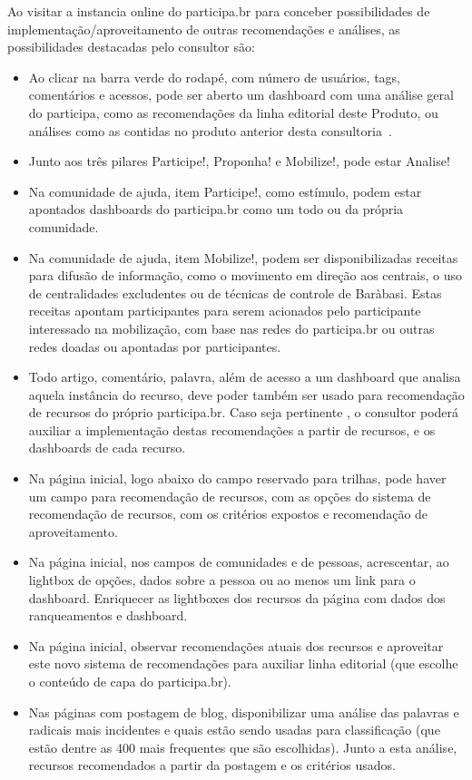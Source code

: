 \documentclass[12pt]{article}
\begin{document}
Ao visitar a instancia online do participa.br para conceber possibilidades de implementação/aproveitamento de outras recomendações e análises, as possibilidades destacadas pelo consultor são:
\begin{itemize}
    \item Ao clicar na barra verde do rodapé, com número de usuários, tags, comentários e acessos, pode ser aberto um dashboard com uma análise geral do participa, como as recomendações da linha editorial deste Produto, ou análises como as contidas no produto anterior desta consultoria~\cite{repoProd3}.
    \item Junto aos três pilares Participe!, Proponha! e Mobilize!, pode estar Analise!
    \item Na comunidade de ajuda, item Participe!, como estímulo, podem estar apontados dashboards do participa.br como um todo ou da própria comunidade.
    \item Na comunidade de ajuda, item Mobilize!, podem ser disponibilizadas receitas para difusão de informação, como o movimento em direção aos centrais, o uso de centralidades excludentes ou de técnicas de controle de Baràbasi. Estas receitas apontam participantes para serem acionados pelo participante interessado na mobilização, com base nas redes do participa.br ou outras redes doadas ou apontadas por participantes.
    \item Todo artigo, comentário, palavra, além de acesso a um dashboard que analisa aquela instância do recurso, deve poder também ser usado para recomendação de recursos do próprio participa.br. Caso seja pertinente , o consultor poderá auxiliar a implementação destas recomendações a partir de recursos, e os dashboards de cada recurso.
    \item Na página inicial, logo abaixo do campo reservado para trilhas, pode haver um campo para recomendação de recursos, com as opções do sistema de recomendação de recursos, com os critérios expostos e recomendação de aproveitamento.
    \item Na página inicial, nos campos de comunidades e de pessoas, acrescentar, ao lightbox de opções, dados sobre a pessoa ou ao menos um link para o dashboard. Enriquecer as lightboxes dos recursos da página com dados dos ranqueamentos e dashboard.
    \item Na página inicial, observar recomendações atuais dos recursos e aproveitar este novo sistema de recomendações para auxiliar linha editorial (que escolhe o conteúdo de capa do participa.br).
    \item Nas páginas com postagem de blog, disponibilizar uma análise das palavras e radicais mais incidentes e quais estão sendo usadas para classificação (que estão dentre as 400 mais frequentes que são escolhidas). Junto a esta análise, recursos recomendados a partir da postagem e os critérios usados.
\end{itemize}
\end{document}

